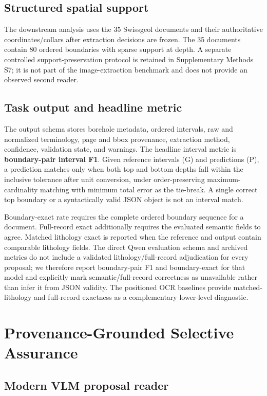 \documentclass[a4paper,fleqn]{cas-sc}
\begin{document}
\subsection{Structured spatial support}

The downstream analysis uses the 35 Swissgeol documents and their authoritative coordinates/collars after extraction decisions are frozen. The 35 documents contain 80 ordered boundaries with sparse support at depth. A separate controlled support-preservation protocol is retained in Supplementary Methods S7; it is not part of the image-extraction benchmark and does not provide an observed second reader.

\subsection{Task output and headline metric}

The output schema stores borehole metadata, ordered intervals, raw and normalized terminology, page and bbox provenance, extraction method, confidence, validation state, and warnings. The headline interval metric is \textbf{boundary-pair interval F1}. Given reference intervals (G) and predictions (P), a prediction matches only when both top and bottom depths fall within the inclusive tolerance after unit conversion, under order-preserving maximum-cardinality matching with minimum total error as the tie-break. A single correct top boundary or a syntactically valid JSON object is not an interval match.

Boundary-exact rate requires the complete ordered boundary sequence for a document. Full-record exact additionally requires the evaluated semantic fields to agree. Matched lithology exact is reported when the reference and output contain comparable lithology fields. The direct Qwen evaluation schema and archived metrics do not include a validated lithology/full-record adjudication for every proposal; we therefore report boundary-pair F1 and boundary-exact for that model and explicitly mark semantic/full-record correctness as unavailable rather than infer it from JSON validity. The positioned OCR baselines provide matched-lithology and full-record exactness as a complementary lower-level diagnostic.

\section{Provenance-Grounded Selective Assurance}

\subsection{Modern VLM proposal reader}
\end{document}

